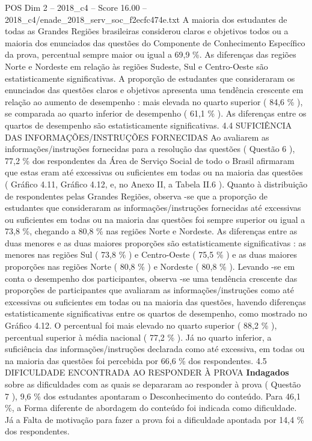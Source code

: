 \begin{textsample}{POS Dim 2 – 2018\_c4 – Score 16.00 – 2018\_c4/enade\_2018\_serv\_soc\_f2ecfc474e.txt}
A maioria dos estudantes de todas as Grandes Regiões brasileiras considerou claros e objetivos todos ou a maioria dos enunciados das questões do Componente de Conhecimento Específico da prova, percentual sempre maior ou igual a 69,9 \%.
As diferenças das regiões Norte e Nordeste em relação às regiões Sudeste, Sul e Centro-Oeste são estatisticamente significativas.
A proporção de estudantes que consideraram os enunciados das questões claros e objetivos apresenta uma tendência crescente em relação ao aumento de desempenho : mais elevada no quarto superior ( 84,6 \% ), se comparada ao quarto inferior de desempenho ( 61,1 \% ).
As diferenças entre os quartos de desempenho são estatisticamente significativas. 4.4 SUFICIÊNCIA DAS INFORMAÇÕES/INSTRUÇÕES FORNECIDAS Ao avaliarem as informações/instruções fornecidas para a resolução das questões ( Questão 6 ), 77,2 \% dos respondentes da Área de Serviço Social de todo o Brasil afirmaram que estas eram até excessivas ou suficientes em todas ou na maioria das questões ( Gráfico 4.11, Gráfico 4.12, e, no Anexo II, a Tabela II.6 ).
Quanto à distribuição de respondentes pelas Grandes Regiões, observa -se que a proporção de estudantes que consideraram as informações/instruções fornecidas até excessivas ou suficientes em todas ou na maioria das questões foi sempre superior ou igual a 73,8 \%, chegando a 80,8 \% nas regiões Norte e Nordeste.
As diferenças entre as duas menores e as duas maiores proporções são estatisticamente significativas : as menores nas regiões Sul ( 73,8 \% ) e Centro-Oeste ( 75,5 \% ) e as duas maiores proporções nas regiões Norte ( 80,8 \% ) e Nordeste ( 80,8 \% ).
Levando -se em conta o desempenho dos participantes, observa -se uma tendência crescente das proporções de participantes que avaliaram as informações/instruções como até excessivas ou suficientes em todas ou na maioria das questões, havendo diferenças estatisticamente significativas entre os quartos de desempenho, como mostrado no Gráfico 4.12.
O percentual foi mais elevado no quarto superior ( 88,2 \% ), percentual superior à média nacional ( 77,2 \% ).
Já no quarto inferior, a suficiência das informações/instruções declarada como até excessiva, em todas ou na maioria das questões foi percebida por 66,6 \% dos respondentes. 4.5 DIFICULDADE ENCONTRADA AO RESPONDER À PROVA \textbf{Indagados} sobre as dificuldades com as quais se depararam ao responder à prova ( Questão 7 ), 9,6 \% dos estudantes apontaram o Desconhecimento do conteúdo.
Para 46,1 \%, a Forma diferente de abordagem do conteúdo foi indicada como dificuldade.
Já a Falta de motivação para fazer a prova foi a dificuldade apontada por 14,4 \% dos respondentes.

\end{textsample}
